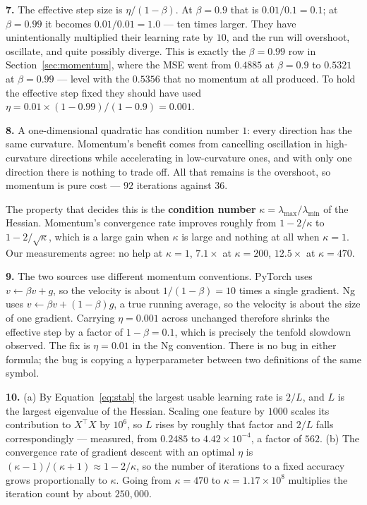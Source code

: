 \documentclass[11pt]{article}
\begin{document}
\medskip
\textbf{7.} The effective step size is $\eta/(1-\beta)$. At $\beta = 0.9$ that
is $0.01/0.1 = 0.1$; at $\beta = 0.99$ it becomes $0.01/0.01 = 1.0$ --- ten
times larger. They have unintentionally multiplied their learning rate by $10$,
and the run will overshoot, oscillate, and quite possibly diverge. This is
exactly the $\beta = 0.99$ row in Section~\ref{sec:momentum}, where the MSE
went from $0.4885$ at $\beta = 0.9$ to $0.5321$ at $\beta = 0.99$ --- level
with the $0.5356$ that no momentum at all produced. To hold the effective
step fixed they should have used
$\eta = 0.01 \times (1-0.99)/(1-0.9) = 0.001$.

\medskip
\textbf{8.} A one-dimensional quadratic has condition number $1$: every
direction has the same curvature. Momentum's benefit comes from cancelling
oscillation in high-curvature directions while accelerating in low-curvature
ones, and with only one direction there is nothing to trade off. All that
remains is the overshoot, so momentum is pure cost --- $92$ iterations against
$36$.

The property that decides this is the \textbf{condition number}
$\kappa = \lambda_{\max}/\lambda_{\min}$ of the Hessian. Momentum's convergence
rate improves roughly from $1 - 2/\kappa$ to $1 - 2/\sqrt{\kappa}$, which is a
large gain when $\kappa$ is large and nothing at all when $\kappa = 1$. Our
measurements agree: no help at $\kappa=1$, $7.1\times$ at $\kappa = 200$,
$12.5\times$ at $\kappa = 470$.

\medskip
\textbf{9.} The two sources use different momentum conventions. PyTorch uses
$v \leftarrow \beta v + g$, so the velocity is about $1/(1-\beta) = 10$ times a
single gradient. Ng uses $v \leftarrow \beta v + (1-\beta) g$, a true running
average, so the velocity is about the size of one gradient. Carrying
$\eta = 0.001$ across unchanged therefore shrinks the effective step by a
factor of $1-\beta = 0.1$, which is precisely the tenfold slowdown observed.
The fix is $\eta = 0.01$ in the Ng convention. There is no bug in either
formula; the bug is copying a hyperparameter between two definitions of
the same symbol.

\medskip
\textbf{10.} (a) By Equation~\eqref{eq:stab} the largest usable learning rate
is $2/L$, and $L$ is the largest eigenvalue of the Hessian. Scaling one feature
by $1000$ scales its contribution to $X^\top X$ by $10^6$, so $L$ rises by
roughly that factor and $2/L$ falls correspondingly --- measured, from $0.2485$
to $4.42\times 10^{-4}$, a factor of $562$. (b) The convergence rate of
gradient descent with an optimal $\eta$ is $(\kappa-1)/(\kappa+1) \approx
1 - 2/\kappa$, so the number of iterations to a fixed accuracy grows
proportionally to $\kappa$. Going from $\kappa = 470$ to
$\kappa = 1.17\times10^8$ multiplies the iteration count by about $250{,}000$.
\end{document}

